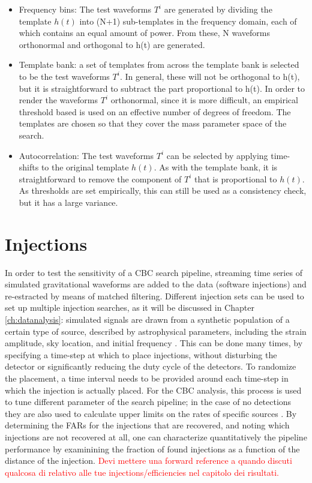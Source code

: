 \documentclass[binding=0.6cm, LaM]{sapthesis}
\newcommand{\fpg}[1]{\textcolor{red}{#1} }
\begin{document}
		\begin{itemize}
 			 \item Frequency bins: The test waveforms $T^i$ are generated by dividing the template $h(t)$ into (N+1) 
				  sub-templates in the frequency domain, each of which contains an equal amount of power. 
				  From these, N waveforms orthonormal and orthogonal to h(t) are generated. 
 			 \item Template bank: a set of templates from across the template bank is selected to be the test waveforms $T^i$.
				  In general, these will not be orthogonal to h(t), but it is straightforward to subtract the part proportional to h(t). 	
				  In order to render the waveforms $T^i$ orthonormal, since it is more difficult, 
				  an empirical threshold based is used on an effective number of degrees of freedom. 
				  The templates are chosen so that they cover the mass parameter space of the search. 
 			 \item Autocorrelation: The test waveforms $T^i$ can be selected by applying time-shifts to the original template  $h(t)$. 
				  As with the template bank, it is straightforward to remove the component of $T^i$ that is proportional to $h(t)$. 
				  As thresholds are set empirically, this can still be used as a consistency check, but it has a large variance. 
		\end{itemize}
\section{Injections}

        In order to test the sensitivity of a CBC search pipeline,
        streaming time series of simulated gravitational waveforms are added to the data (software injections)
        and re-estracted by means of matched filtering.
        Different injection sets can be used to set up multiple injection searches, as it will be discussed in Chapter \ref{ch:datanalysis}:
        simulated signals are drawn from a synthetic population of a certain type of source,
        described by astrophysical parameters, including the strain amplitude, sky location,
        and initial frequency \cite{30}.
        This can be done many times, by specifying a time-step at which to place injections,
        without disturbing the detector or significantly reducing the duty cycle of the detectors.
        To randomize the placement, a time interval needs to be provided around
        each time-step in which the injection is actually placed.
        For the CBC analysis, this process is used to tune different parameter of the search pipeline;
        in the case of no detections they are also used to calculate upper limits on the rates of specific sources \cite{47}.
        By determining the FARs for the injections that are recovered,
        and noting which injections are not recovered at all,
        one can characterize quantitatively the pipeline performance \cite{47, 48}
        by examinining the fraction of found injections as a function of the distance of the injection.
\fpg{Devi mettere una forward reference a quando discuti qualcosa di relativo alle tue injections/efficiencies nel capitolo dei risultati.}
	
\end{document}
